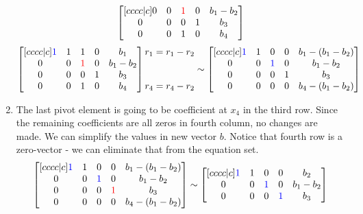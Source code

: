 \begin{enumerate}
\begin{equation}
\begin{bmatrix}[cccc|c]
    0 & 0 & \textcolor{red}{1} & 0 & b_1 - b_2 \\ 
    0 & 0 & 0 & 1 & b_3 \\ 
    0 & 0 & 1 & 0 & b_4
\end{bmatrix}
\end{equation}
\begin{equation}
\begin{bmatrix}[cccc|c]
    \textcolor{blue}{1} & 1 & 1 & 0 & b_1 \\ 
    0 & 0 & \textcolor{red}{1} & 0 & b_1 - b_2 \\ 
    0 & 0 & 0 & 1 & b_3 \\ 
    0 & 0 & 1 & 0 & b_4
\end{bmatrix}
\begin{matrix} r_1 = r_1 - r_2\\ \\ \\ r_4 = r_4 - r_2\end{matrix} \sim
\begin{bmatrix}[cccc|c]
    \textcolor{blue}{1} & 1 & 0 & 0 & b_1 - (b_1 - b_2) \\ 
    0 & 0 & \textcolor{blue}{1} & 0 & b_1 - b_2 \\ 
    0 & 0 & 0 & 1 & b_3 \\ 
    0 & 0 & 0 & 0 & b_4 - (b_1 - b_2)
\end{bmatrix}
\end{equation}

\item The last pivot element is going to be coefficient at $x_4$ in the third row.
Since the remaining coefficients are all zeros in fourth column, no changes are made.
We can simplify the values in new vector $b$.
Notice that fourth row is a zero-vector - we can eliminate that from the equation set.
\begin{equation}
\begin{bmatrix}[cccc|c]
    \textcolor{blue}{1} & 1 & 0 & 0 & b_1 - (b_1 - b_2) \\ 
    0 & 0 & \textcolor{blue}{1} & 0 & b_1 - b_2 \\ 
    0 & 0 & 0 & \textcolor{red}{1} & b_3 \\ 
    0 & 0 & 0 & 0 & b_4 - (b_1 - b_2)
\end{bmatrix}
\sim
\begin{bmatrix}[cccc|c]
    \textcolor{blue}{1} & 1 & 0 & 0 & b_2 \\ 
    0 & 0 & \textcolor{blue}{1} & 0 & b_1 - b_2 \\ 
    0 & 0 & 0 & \textcolor{blue}{1} & b_3 \\ 
\end{bmatrix}
\end{equation}
\end{enumerate}

